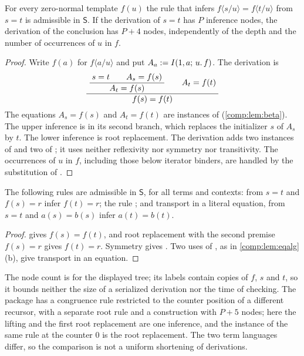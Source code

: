 \begin{theorem}
\label{comp:thm:seedcong}
For every zero-normal template $f(u)$ the rule that infers
$f\langle s/u\rangle=f\langle t/u\rangle$ from $s=t$ is admissible in
$\mathsf{S}$. If the derivation of $s=t$ has $P$ inference nodes, the
derivation of the conclusion has $P+4$ nodes, independently of the depth and
the number of occurrences of $u$ in $f$.
\end{theorem}

\begin{proof}
Write $f(a)$ for $f\langle a/u\rangle$ and put
$A_a\mathrel{:=}I(1,a;\,u.\,f)$. The derivation is
\[
 \dfrac{\;\dfrac{\;s=t\qquad A_s=f(s)\;}{\;A_t=f(s)\;}\qquad A_t=f(t)\;}{\;f(s)=f(t)\;}
\]
The equations $A_s=f(s)$ and $A_t=f(t)$ are instances of 
(\cref{comp:lem:beta}). The upper inference is  in its second
branch, which replaces the initializer $s$ of $A_s$ by $t$. The lower
inference is root replacement. The derivation adds two instances of
 and two of ; it uses neither reflexivity nor
symmetry nor transitivity. The occurrences of $u$ in $f$, including those
below iterator binders, are handled by the substitution of .
\end{proof}

\begin{corollary}[Transport]
\label{comp:cor:seedtr}
The following rules are admissible in $\mathsf{S}$, for all terms and
contexts: from $s=t$ and $f(s)=r$ infer $f(t)=r$; the rule ;
and transport in a literal equation, from $s=t$ and $a(s)=b(s)$ infer
$a(t)=b(t)$.
\end{corollary}

\begin{proof}
 gives $f(s)=f(t)$, and root replacement with the
second premise $f(s)=r$ gives $f(t)=r$. Symmetry gives . Two
uses of , as in \cref{comp:lem:eqalg}(b), give transport in an
equation.
\end{proof}

\begin{remark}
The node count is for the displayed tree; its labels contain copies of $f$,
$s$ and $t$, so it bounds neither the size of a serialized derivation nor
the time of checking. The package  has a congruence rule
restricted to the counter position of a different recursor, with a separate
root rule and a construction with $P+5$ nodes; here the lifting and the
first root replacement are one inference, and the instance of the same rule
at the counter $0$ is the root replacement. The two term languages differ,
so the comparison is not a uniform shortening of derivations.
\end{remark}

